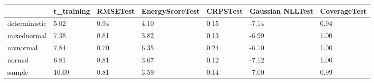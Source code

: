 \begin{tabular}{lllllll}
\toprule
 & t_training & RMSETest & EnergyScoreTest & CRPSTest & Gaussian NLLTest & CoverageTest \\
\midrule
deterministic & 5.02 & 0.94 & 4.10 & 0.15 & -7.14 & 0.94 \\
mixednormal & 7.38 & 0.81 & 3.82 & 0.13 & -6.99 & 1.00 \\
mvnormal & 7.84 & 0.70 & 6.35 & 0.24 & -6.10 & 1.00 \\
normal & 6.81 & 0.81 & 3.67 & 0.12 & -7.12 & 1.00 \\
sample & 10.69 & 0.81 & 3.59 & 0.14 & -7.00 & 0.99 \\
\bottomrule
\end{tabular}
